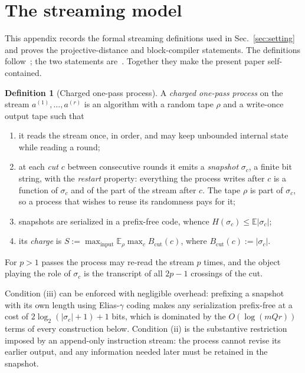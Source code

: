 \documentclass[aps,prx,twocolumn,superscriptaddress,nofootinbib,longbibliography]{revtex4-2}
\theoremstyle{plain}
\theoremstyle{definition}
\newtheorem{definition}{Definition}
\theoremstyle{remark}
\newcommand{\E}{\mathbb{E}}
\begin{document}
\appendix

\section{The streaming model}\label{app:model}

This appendix records the formal streaming definitions used in Sec.~\ref{sec:setting} and proves the projective-distance and block-compiler statements. The definitions follow~\cite[Defs.~9, 13, 20, 21]{Paper1}; the two statements are~\cite[Lem.~1, Prop.~10]{Paper1}. Together they make the present paper self-contained.

\begin{definition}[Charged one-pass process]\label{def:model}
A \emph{charged one-pass process} on the stream $a^{(1)},\dots,a^{(r)}$ is an algorithm with a random tape $\rho$ and a write-once output tape such that
\begin{enumerate}\setlength\itemsep{0pt}
\item[(i)] it reads the stream once, in order, and may keep unbounded internal state while reading a round;
\item[(ii)] at each \emph{cut} $c$ between consecutive rounds it emits a \emph{snapshot} $\sigma_c$, a finite bit string, with the \emph{restart} property: everything the process writes after $c$ is a function of $\sigma_c$ and of the part of the stream after $c$. The tape $\rho$ is part of $\sigma_c$, so a process that wishes to reuse its randomness pays for it;
\item[(iii)] snapshots are serialized in a prefix-free code, whence $H(\sigma_c)\le\E|\sigma_c|$;
\item[(iv)] its \emph{charge} is $S:=\max_{\mathrm{input}}\E_\rho\max_cB_{\mathrm{cut}}(c)$, where $B_{\mathrm{cut}}(c):=|\sigma_c|$.
\end{enumerate}
For $p>1$ passes the process may re-read the stream $p$ times, and the object playing the role of $\sigma_c$ is the transcript of all $2p-1$ crossings of the cut.
\end{definition}
Condition (iii) can be enforced with negligible overhead: prefixing a snapshot with its own length using Elias-$\gamma$ coding makes any serialization prefix-free at a cost of $2\log_2(|\sigma_c|+1)+1$ bits, which is dominated by the $O(\log(mQr))$ terms of every construction below. Condition (ii) is the substantive restriction imposed by an append-only instruction stream: the process cannot revise its earlier output, and any information needed later must be retained in the snapshot.
\end{document}
